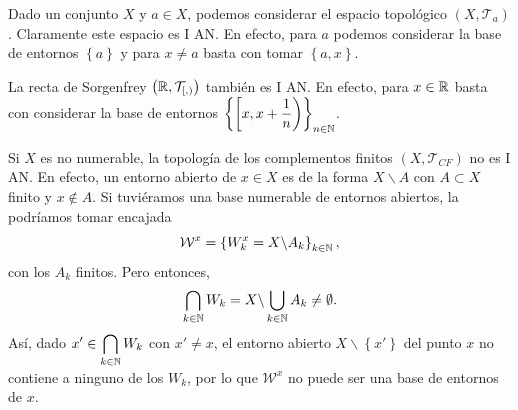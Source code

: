 \begin{eg}
	Dado un conjunto $\displaystyle X $ y $\displaystyle a \in X $, podemos considerar el espacio topológico $\displaystyle \left(X, \mathcal{T}_{a}\right) $. Claramente este espacio es I AN. En efecto, para $\displaystyle a $ podemos considerar la base de entornos $\displaystyle \left\{ a\right\}  $ y para $\displaystyle x \neq a $ basta con tomar $\displaystyle \left\{ a,x\right\}  $.
\end{eg}
\begin{eg}
La recta de Sorgenfrey $\displaystyle \left(\mathbb{R}, \mathcal{T}_{[,)}\right) $ también es I AN. En efecto, para $\displaystyle x \in \mathbb{R} $ basta con considerar la base de entornos $\displaystyle \left\{ \left[x, x + \frac{1}{n}\right)\right\} _{n \in \mathbb{N}} $.
\end{eg}
 
\begin{eg}
Si $\displaystyle X $ es no numerable, la topología de los complementos finitos $\displaystyle \left(X, \mathcal{T}_{CF}\right) $ no es I AN. En efecto, un entorno abierto de $\displaystyle x\in X $ es de la forma $\displaystyle X \backslash A $ con $\displaystyle A \subset X $ finito y $\displaystyle x \not\in A $. 
Si tuviéramos una base numerable de entornos abiertos, la podríamos tomar encajada
\[\mathcal{W}^{x} = \left\{ W^{x}_{k} = X \backslash A_{k}\right\} _{k \in \mathbb{N}} ,\]
con los $\displaystyle A_{k} $ finitos. Pero entonces, 
\[\bigcap_{k \in \mathbb{N}}W_{k} = X \backslash \bigcup_{k \in \mathbb{N}}A_{k}\neq \emptyset .\]
Así, dado $\displaystyle x' \in \bigcap_{k \in \mathbb{N}}W_{k} $ con $\displaystyle x' \neq x $, el entorno abierto $\displaystyle X \backslash \left\{ x'\right\}  $ del punto $\displaystyle x $ no contiene a ninguno de los $\displaystyle W_{k} $, por lo que $\displaystyle \mathcal{W}^{x} $ no puede ser una base de entornos de $\displaystyle x $.
\end{eg}
